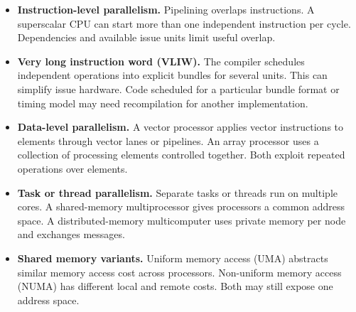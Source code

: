 \documentclass[12pt,a4paper]{article}
\begin{document}
\begin{itemize}[leftmargin=*,itemsep=4pt]
\item \textbf{Instruction-level parallelism.} Pipelining overlaps instructions. A superscalar CPU can start more than one independent instruction per cycle. Dependencies and available issue units limit useful overlap.
\item \textbf{Very long instruction word (VLIW).} The compiler schedules independent operations into explicit bundles for several units. This can simplify issue hardware. Code scheduled for a particular bundle format or timing model may need recompilation for another implementation.
\item \textbf{Data-level parallelism.} A vector processor applies vector instructions to elements through vector lanes or pipelines. An array processor uses a collection of processing elements controlled together. Both exploit repeated operations over elements.
\item \textbf{Task or thread parallelism.} Separate tasks or threads run on multiple cores. A shared-memory multiprocessor gives processors a common address space. A distributed-memory multicomputer uses private memory per node and exchanges messages.
\item \textbf{Shared memory variants.} Uniform memory access (UMA) abstracts similar memory access cost across processors. Non-uniform memory access (NUMA) has different local and remote costs. Both may still expose one address space.
\end{itemize}
\end{document}
